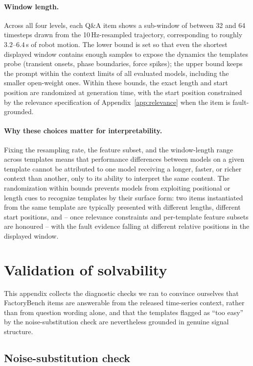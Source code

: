 \documentclass{article}
\begin{document}
\paragraph{Window length.} Across all four levels, each Q\&A item shows a sub-window of between 32 and 64 timesteps drawn from the 10\,Hz-resampled trajectory, corresponding to roughly $3.2$--$6.4$\,s of robot motion. The lower bound is set so that even the shortest displayed window contains enough samples to expose the dynamics the templates probe (transient onsets, phase boundaries, force spikes); the upper bound keeps the prompt within the context limits of all evaluated models, including the smaller open-weight ones. Within these bounds, the exact length and start position are randomized at generation time, with the start position constrained by the relevance specification of Appendix~\ref{app:relevance} when the item is fault-grounded.

\paragraph{Why these choices matter for interpretability.} Fixing the resampling rate, the feature subset, and the window-length range across templates means that performance differences between models on a given template cannot be attributed to one model receiving a longer, faster, or richer context than another, only to its ability to interpret the same content. The randomization within bounds prevents models from exploiting positional or length cues to recognize templates by their surface form: two items instantiated from the same template are typically presented with different lengths, different start positions, and -- once relevance constraints and per-template feature subsets are honoured -- with the fault evidence falling at different relative positions in the displayed window.

\section{Validation of solvability}
\label{app:solvability}

This appendix collects the diagnostic checks we ran to convince ourselves that FactoryBench items are answerable from the released time-series context, rather than from question wording alone, and that the templates flagged as ``too easy'' by the noise-substitution check are nevertheless grounded in genuine signal structure.

\subsection{Noise-substitution check}
\label{app:noise_substitution}
\end{document}
